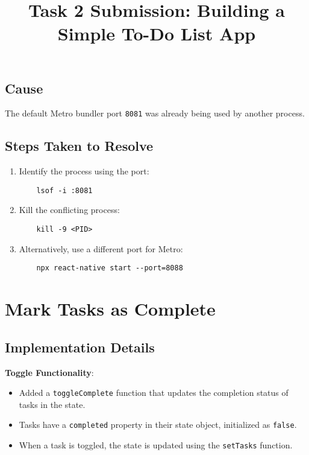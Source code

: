 \documentclass[12pt]{article}
\begin{document}
\subsection*{Cause}
The default Metro bundler port \texttt{8081} was already being used by another process.

\subsection*{Steps Taken to Resolve}
\begin{enumerate}
    \item Identify the process using the port:
    \begin{verbatim}
    lsof -i :8081
    \end{verbatim}
    \item Kill the conflicting process:
    \begin{verbatim}
    kill -9 <PID>
    \end{verbatim}
    \item Alternatively, use a different port for Metro:
    \begin{verbatim}
    npx react-native start --port=8088
    \end{verbatim}
\end{enumerate}




\title{Task 2 Submission: Building a Simple To-Do List App}
\author{}
\date{}
\maketitle


\section{Mark Tasks as Complete}

\subsection{Implementation Details}

\textbf{Toggle Functionality}:
\begin{itemize}
    \item Added a \texttt{toggleComplete} function that updates the completion status of tasks in the state.
    \item Tasks have a \texttt{completed} property in their state object, initialized as \texttt{false}.
    \item When a task is toggled, the state is updated using the \texttt{setTasks} function.
\end{itemize}
\end{document}
